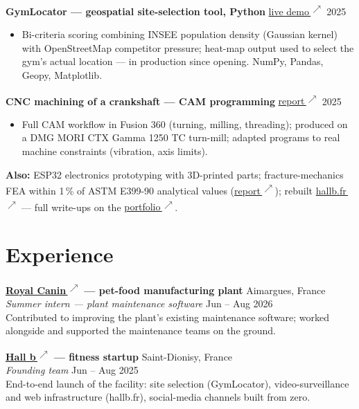 \documentclass[10pt,a4paper]{article}
\newcommand{\lk}{\,\textsuperscript{$\nearrow$}}
\newcommand{\link}[2]{\href{#1}{#2\lk}}
\begin{document}
\textbf{GymLocator --- geospatial site-selection tool, Python} \enspace\link{https://gauthierbonhomme.com/python.html}{live demo} \hfill 2025
\begin{itemize}
  \item Bi-criteria scoring combining INSEE population density (Gaussian kernel) with OpenStreetMap competitor pressure; heat-map output used to select the gym's actual location --- in production since opening. NumPy, Pandas, Geopy, Matplotlib.
\end{itemize}

\textbf{CNC machining of a crankshaft --- CAM programming} \enspace\link{https://gauthierbonhomme.com/usinage.html}{report} \hfill 2025
\begin{itemize}
  \item Full CAM workflow in Fusion 360 (turning, milling, threading); produced on a DMG MORI CTX Gamma 1250 TC turn-mill; adapted programs to real machine constraints (vibration, axis limits).
\end{itemize}

\vspace{0.2em}
\textbf{Also:} ESP32 electronics prototyping with 3D-printed parts; fracture-mechanics FEA within 1\,\% of ASTM E399-90 analytical values (\link{https://gauthierbonhomme.com/abaqus.html}{report}); rebuilt \link{https://www.hallb.fr/}{hallb.fr} --- full write-ups on the \link{https://gauthierbonhomme.com}{portfolio}.

\section{Experience}

\textbf{\link{https://www.royalcanin.com/}{Royal Canin} --- pet-food manufacturing plant} \hfill Aimargues, France\\
\textit{Summer intern --- plant maintenance software} \hfill Jun -- Aug 2026\\
Contributed to improving the plant's existing maintenance software; worked alongside and supported the maintenance teams on the ground.

\vspace{0.35em}
\textbf{\link{https://www.hallb.fr/}{Hall b} --- fitness startup} \hfill Saint-Dionisy, France\\
\textit{Founding team} \hfill Jun -- Aug 2025\\
End-to-end launch of the facility: site selection (GymLocator), video-surveillance and web infrastructure (hallb.fr), social-media channels built from zero.
\end{document}
